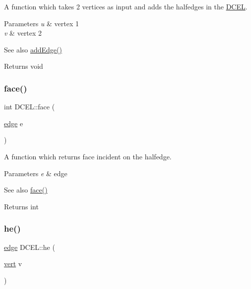 A function which takes 2 vertices as input and adds the halfedges in the \hyperlink{class_d_c_e_l}{D\+C\+EL}. 


\begin{DoxyParams}{Parameters}
{\em u} & vertex 1 \\
\hline
{\em v} & vertex 2 \\
\hline
\end{DoxyParams}
\begin{DoxySeeAlso}{See also}
\hyperlink{class_d_c_e_l_aed8e7593ec708470baff3e6c9da353ff}{add\+Edge()} 
\end{DoxySeeAlso}
\begin{DoxyReturn}{Returns}
void 
\end{DoxyReturn}
\mbox{\label{class_d_c_e_l_a484956955fab5d68192aace0ca07bf70}} 
\subsubsection{\texorpdfstring{face()}{face()}}
{\footnotesize\ttfamily int D\+C\+E\+L\+::face (\begin{DoxyParamCaption}\item[{\hyperlink{_polygon_triangulation_8h_a4ef43ff5c6d42dacbc8ffd9c8cfdc189}{edge}}]{e }\end{DoxyParamCaption})\hspace{0.3cm}{\ttfamily [inline]}}



A function which returns face incident on the halfedge. 


\begin{DoxyParams}{Parameters}
{\em e} & edge \\
\hline
\end{DoxyParams}
\begin{DoxySeeAlso}{See also}
\hyperlink{class_d_c_e_l_a484956955fab5d68192aace0ca07bf70}{face()} 
\end{DoxySeeAlso}
\begin{DoxyReturn}{Returns}
int 
\end{DoxyReturn}
\mbox{\label{class_d_c_e_l_abc4ba3118faae5afdebc3a180daa4789}} 
\subsubsection{\texorpdfstring{he()}{he()}}
{\footnotesize\ttfamily \hyperlink{_polygon_triangulation_8h_a4ef43ff5c6d42dacbc8ffd9c8cfdc189}{edge} D\+C\+E\+L\+::he (\begin{DoxyParamCaption}\item[{\hyperlink{_polygon_triangulation_8h_a15bccd83c1e570e4a0ff17c42152989b}{vert}}]{v }\end{DoxyParamCaption})\hspace{0.3cm}{\ttfamily [inline]}}



